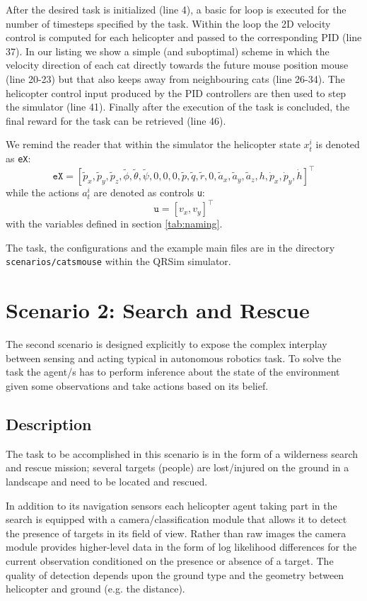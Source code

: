 \documentclass[a4paper,11pt]{report}
\newcommand{\sname}{QRSim\xspace}
\newcommand\mytexttt[1]{\texttt{\hyphenchar\font=45\relax #1}}
\begin{document}
After the desired task is initialized (line 4), a basic for loop is executed for the number of timesteps specified by the task. Within the loop the 2D velocity control is computed for each helicopter and passed to the corresponding PID (line 37). 
In our listing we show a simple (and suboptimal) scheme in which the velocity direction of each cat directly towards the future mouse position mouse (line 20-23) but that also keeps away from neighbouring cats (line 26-34). 
The helicopter control input produced by the PID controllers are then used to step the simulator (line 41).
Finally after the execution of the task is concluded, the final reward for the task can be retrieved (line 46).

We remind the reader that within the simulator the helicopter state $x^i_t$ is denoted as \texttt{eX}:
$$\texttt{eX} = [\tilde{p}_x,\tilde{p}_y,\tilde{p}_z,\tilde{\phi},\tilde{\theta},\tilde{\psi},0,0,0,\tilde{p},\tilde{q},\tilde{r},0,\tilde{a}_x,\tilde{a}_y,\tilde{a}_z,h,\dot{p}_x,\dot{p}_y,\dot{h}]^\intercal$$
while the actions $a^i_t$ are denoted as controls \texttt{u}:
$$\texttt{u}=[v_x,v_y]^\intercal$$
with the variables defined in section \ref{tab:naming}.

The task, the configurations and the example main files are in the directory \mytexttt{scenarios/catsmouse} within the \sname simulator. 

\newpage
\section{Scenario 2: Search and Rescue}
The second scenario is designed explicitly to expose the complex interplay between sensing and acting typical in autonomous robotics task. To solve the task the agent/s has to perform inference about the state of the environment given some observations and take actions based on its belief. 

\subsection{Description}
The task to be accomplished in this scenario is in the form of a wilderness search and rescue mission; several targets (people) are lost/injured on the ground in a landscape and need to be located and rescued. 

In addition to its navigation sensors each helicopter agent taking part in the search 
is equipped with a camera/classification module that allows it to detect the presence of targets in its field of view. Rather than raw images the camera module provides higher-level data in the form of log likelihood differences for the current observation conditioned on the presence or absence of a target. The quality of detection depends upon the ground type and the geometry between helicopter and ground (e.g. the distance).  
\end{document}
